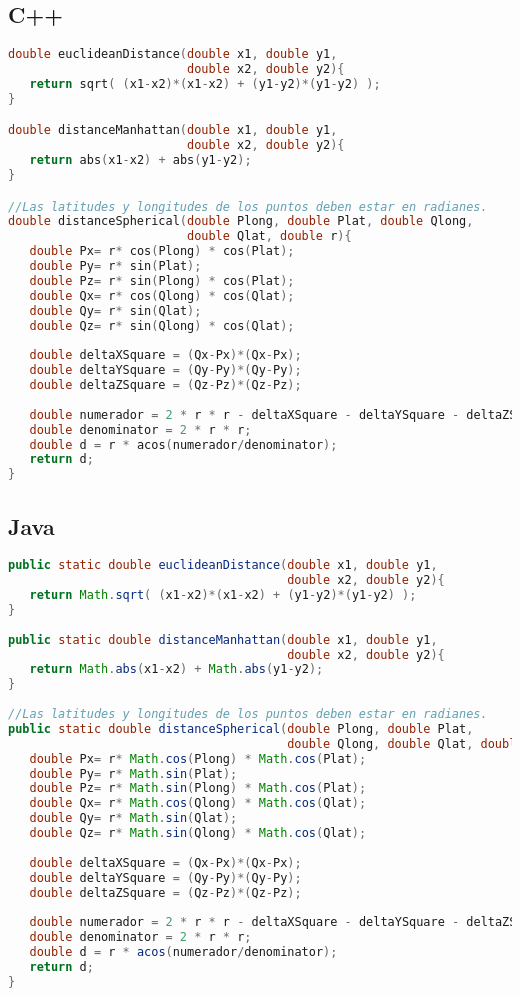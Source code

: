 \subsection{C++}
\begin{lstlisting}[language=C++]
double euclideanDistance(double x1, double y1, 
                         double x2, double y2){
   return sqrt( (x1-x2)*(x1-x2) + (y1-y2)*(y1-y2) );
}

double distanceManhattan(double x1, double y1, 
                         double x2, double y2){
   return abs(x1-x2) + abs(y1-y2);
}

//Las latitudes y longitudes de los puntos deben estar en radianes.
double distanceSpherical(double Plong, double Plat, double Qlong, 
                         double Qlat, double r){
   double Px= r* cos(Plong) * cos(Plat);
   double Py= r* sin(Plat);
   double Pz= r* sin(Plong) * cos(Plat);
   double Qx= r* cos(Qlong) * cos(Qlat);
   double Qy= r* sin(Qlat);
   double Qz= r* sin(Qlong) * cos(Qlat);
	
   double deltaXSquare = (Qx-Px)*(Qx-Px);
   double deltaYSquare = (Qy-Py)*(Qy-Py);
   double deltaZSquare = (Qz-Pz)*(Qz-Pz);
	
   double numerador = 2 * r * r - deltaXSquare - deltaYSquare - deltaZSquare;
   double denominator = 2 * r * r;
   double d = r * acos(numerador/denominator);
   return d;
}
\end{lstlisting} 

\subsection{Java}
\begin{lstlisting}[language=Java]
public static double euclideanDistance(double x1, double y1, 
                                       double x2, double y2){
   return Math.sqrt( (x1-x2)*(x1-x2) + (y1-y2)*(y1-y2) );
}
	
public static double distanceManhattan(double x1, double y1, 
                                       double x2, double y2){
   return Math.abs(x1-x2) + Math.abs(y1-y2);
}
		
//Las latitudes y longitudes de los puntos deben estar en radianes.
public static double distanceSpherical(double Plong, double Plat, 
                                       double Qlong, double Qlat, double r){
   double Px= r* Math.cos(Plong) * Math.cos(Plat);
   double Py= r* Math.sin(Plat);
   double Pz= r* Math.sin(Plong) * Math.cos(Plat);
   double Qx= r* Math.cos(Qlong) * Math.cos(Qlat);
   double Qy= r* Math.sin(Qlat);
   double Qz= r* Math.sin(Qlong) * Math.cos(Qlat);
	
   double deltaXSquare = (Qx-Px)*(Qx-Px);
   double deltaYSquare = (Qy-Py)*(Qy-Py);
   double deltaZSquare = (Qz-Pz)*(Qz-Pz);
	
   double numerador = 2 * r * r - deltaXSquare - deltaYSquare - deltaZSquare;
   double denominator = 2 * r * r;
   double d = r * acos(numerador/denominator);
   return d;
}
\end{lstlisting} 
